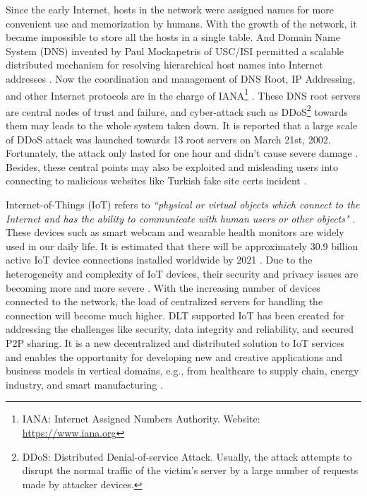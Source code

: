 Since the early Internet, hosts in the network were assigned names for more convenient use and memorization by humans. With the growth of the network, it became impossible to store all the hosts in a single table.
And Domain Name System (DNS) invented by Paul Mockapetris of USC/ISI permitted a scalable distributed mechanism for resolving hierarchical host names into Internet addresses \cite{leiner2009brief}.
Now the coordination and management of DNS Root, IP Addressing, and other Internet protocols are in the charge of IANA\footnote{IANA: Internet Assigned Numbers Authority. Website: \url{https://www.iana.org}} \cite{Postel1994DomainNS}.
These DNS root servers are central nodes of trust and failure, and cyber-attack such as DDoS\footnote{DDoS: Distributed Denial-of-service Attack.
    Usually, the attack attempts to disrupt the normal traffic of the victim's server by a large number of requests made by attacker devices.} towards them may leads to the whole system taken down.
It is reported that a large scale of DDoS attack was launched towards 13 root servers on March 21st, 2002. Fortunately, the attack only lasted for one hour and didn't cause severe damage \cite{mcguire2002attack}.
Besides, these central points may also be exploited and misleading users into connecting to malicious websites like Turkish fake site certs incident \cite{rosenblatt_2013}.


Internet-of-Things (IoT) refers to \textit{``physical or virtual objects which connect to the Internet and has the ability to communicate with human users or other objects"} \cite{6978614}.
These devices such as smart webcam and wearable health monitors are widely used in our daily life.
It is estimated that there will be approximately 30.9 billion active IoT device connections installed worldwide by 2021 \cite{statista_2021}.
Due to the heterogeneity and complexity of IoT devices, their security and privacy issues are becoming more and more severe \cite{6978614}.
With the increasing number of devices connected to the network, the load of centralized servers for handling the connection will become much higher.
DLT supported IoT has been created for addressing the challenges like security, data integrity and reliability, and secured P2P sharing.
It is a new decentralized and distributed solution to IoT services and enables the opportunity for developing new and creative applications and business models in vertical domains, e.g., from healthcare to supply chain, energy industry, and smart manufacturing \cite{Farahani2020TheCO}.


